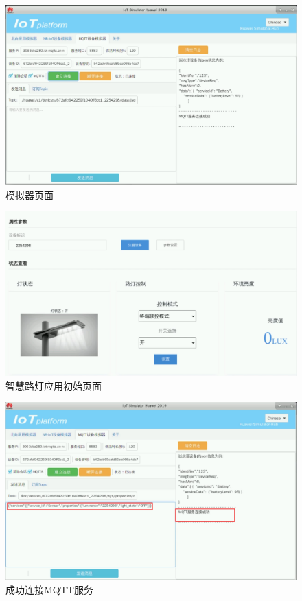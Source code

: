 \begin{figure}[!htbp]
\centering
\includegraphics[width=\textwidth]{figures/序列 01.00_18_16_00.Still011.png}
\caption{模拟器页面}\label{模拟器页面}
\end{figure}

\begin{figure}[!htbp]
\centering
\includegraphics[width=\textwidth]{figures/序列 01.00_19_20_22.Still012.png}
\caption{智慧路灯应用初始页面}\label{智慧路灯应用初始页面}
\end{figure}

\begin{figure}[!htbp]
\centering
\includegraphics[width=\textwidth]{figures/序列 01.00_19_35_30.Still013.png}
\caption{成功连接MQTT服务}\label{成功连接MQTT服务}
\end{figure}

